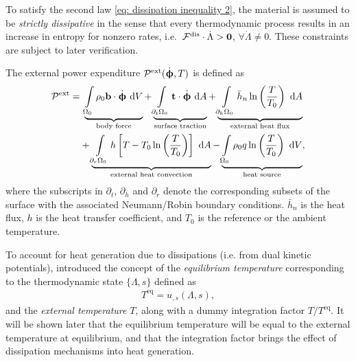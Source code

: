 To satisfy the second law \eqref{eq: dissipation inequality 2}, the material is assumed to be \emph{strictly dissipative} in the sense that every thermodynamic process results in an increase in entropy for nonzero rates, i.e.\ $\mathcal{F}^\text{dis}\cdot\dot{\Lambda} > \boldsymbol{0}$, $\forall \dot{\Lambda} \neq 0$. These constraints are subject to later verification.

The external power expenditure $\mathcal{P}^\text{ext}(\dot{\boldsymbol{\upphi}}, T)$ is defined as
\begin{equation}
  \begin{aligned}
    \mathcal{P}^\text{ext} = & \ \underbrace{\int\limits_{\Omega_0} \rho_0 \textbf{b} \cdot \dot{\boldsymbol{\upphi}} \text{ d}V}_\text{body force} + \underbrace{\int\limits_{\partial_t\Omega_0} \textbf{t} \cdot \dot{\boldsymbol{\upphi}} \text{ d}A}_\text{surface traction} + \underbrace{\int\limits_{\partial_h\Omega_0} \bar{h}_n\ln\left( \dfrac{T}{T_0} \right) \text{ d}A}_\text{external heat flux} \\
                             & + \underbrace{\int\limits_{\partial_r\Omega_0} h\left[ T - T_0 \ln\left( \dfrac{T}{T_0} \right) \right] \text{ d}A}_\text{external heat convection} - \underbrace{\int\limits_{\Omega_0} \rho_0 q \ln\left( \dfrac{T}{T_0} \right) \text{ d}V}_\text{heat source},                                                               
  \end{aligned}\label{eq: external power}
\end{equation}
where the subscripts in $\partial_t$, $\partial_h$ and $\partial_r$ denote the corresponding subsets of the surface with the associated Neumann/Robin boundary conditions. $\bar{h}_n$ is the heat flux, $h$ is the heat transfer coefficient, and $T_0$ is the reference or the ambient temperature.

To account for heat generation due to dissipations (i.e. from dual kinetic potentials), \citet{yang2006variational} introduced the concept of the \emph{equilibrium temperature} corresponding to the thermodynamic state $\{ \Lambda, s \}$ defined as
\begin{align}
  T^\text{eq} = u_{,s}(\Lambda, s),
\end{align}
and the \emph{external temperature} $T$, along with a dummy integration factor $T/T^\text{eq}$. It will be shown later that the equilibrium temperature will be equal to the external temperature at equilibrium, and that the integration factor brings the effect of dissipation mechanisms into heat generation.

